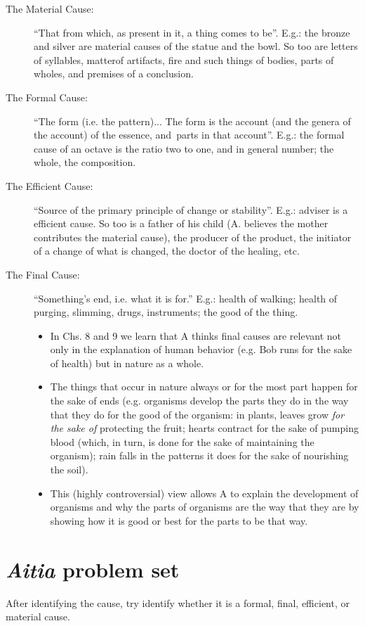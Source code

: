 \documentclass[oneside]{article}
\begin{document}
\begin{description}
\item[The Material Cause:] ``That from which, as present in it, a thing comes to be''. E.g.: the bronze and silver are material causes of the statue and the bowl. So too are letters of syllables, matterof artifacts, fire and such things of bodies, parts of wholes, and premises of a conclusion.
\item[The Formal Cause:] ``The form (i.e. the pattern)... The form is the account (and the genera of the account) of the essence, and\ parts in that account''. E.g.: the  formal cause of an octave is the ratio two to one, and in general number; the whole, the composition.
\item[The Efficient Cause:] ``Source of the primary principle of change or stability''. E.g.: adviser is a efficient cause. So too is a father of his child (A. believes the mother contributes the material cause), the producer of the product, the initiator of a change of what is changed, the doctor of the healing, etc.

\item [The Final Cause:] ``Something's end, i.e. what it is for.'' E.g.: health of walking; health of purging, slimming, drugs, instruments; the good of the thing.
\begin{itemize}
\item  In Chs. 8 and 9 we learn that A thinks final causes are relevant not only in the explanation of human behavior (e.g. Bob runs for the sake of health) but in nature as a whole.
\item The things that occur in nature always or for the most part happen for the sake of ends (e.g. organisms develop the parts they do in the way that they do for the good of the organism: in plants, leaves grow \emph{for the sake of} protecting the fruit; hearts contract for the sake of pumping blood (which, in turn, is done for the sake of maintaining the organism); rain falls in the patterns it does for the sake of nourishing the soil).
\item This (highly controversial) view allows A to explain the development of organisms and why the parts of organisms are the way that they are by showing how it is good or best for the parts to be that way.
\end{itemize}
\end{description}


\section*{\emph{Aitia} problem set}
After identifying the cause, try identify whether it is a formal, final, efficient, or material cause. 
\end{document}
